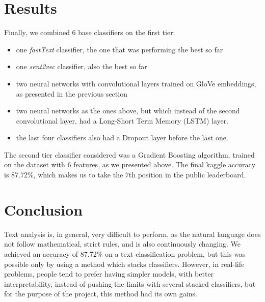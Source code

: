 \documentclass[10pt,conference,compsocconf]{IEEEtran}
\begin{document}
\section{Results}

Finally, we combined 6 base classifiers on the first tier: 
\begin{itemize}
	\item one \textit{fastText} classifier, the one that was performing the best so far
	\item one \textit{sent2vec} classifier, also the best so far
	\item two neural networks with convolutional layers trained on GloVe embeddings, as presented in the previous section
	\item two neural networks as the ones above, but which instead of the second convolutional layer, had a Long-Short Term Memory (LSTM) layer.
	\item the last four classifiers also had a Dropout layer before the last one. 
\end{itemize}

The second tier classifier considered was a Gradient Boosting algorithm, trained on the dataset with 6 features, as we presented above. The final kaggle accuracy is 87.72\%, which makes us to take the 7th position in the public leaderboard. 

\section{Conclusion}

Text analysis is, in general, very difficult to perform, as the natural language does not follow mathematical, strict rules, and is also continuously changing. We achieved an accuracy of 87.72\% on a text classification problem, but this was possible only by using a method which stacks classifiers. However, in real-life problems, people tend to prefer having simpler models, with better interpretability, instead of pushing the limits with several stacked classifiers, but for the purpose of the project, this method had its own gains. 




\end{document}

